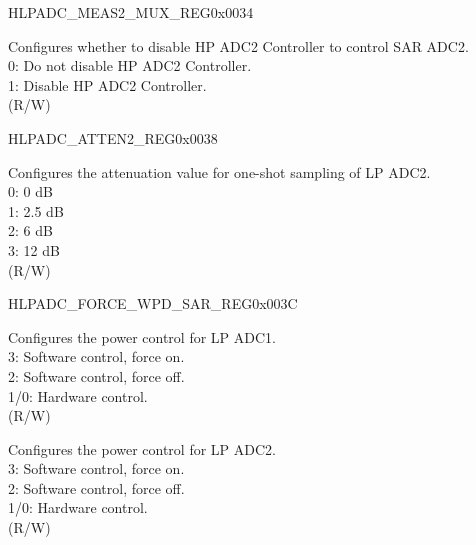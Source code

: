 \begin{register}{H}{LPADC\_MEAS2\_MUX\_REG}{0x0034}\label{regdesc:LPADCMEAS2MUXREG}
%
%
\regnewline%
\begin{regdesc}\begin{reglist}
\label{fielddesc:LPADCSAR2LPFORCE}\item [LPADC\_SAR2\_LP\_FORCE] Configures whether to disable HP ADC2 Controller to control SAR ADC2.\\
0: Do not disable HP ADC2 Controller. \\
1: Disable HP ADC2 Controller. \\
(R/W)
\end{reglist}\end{regdesc}
\end{register}


\begin{register}{H}{LPADC\_ATTEN2\_REG}{0x0038}\label{regdesc:LPADCATTEN2REG}
%
\regnewline%
\begin{regdesc}\begin{reglist}
\label{fielddesc:LPADCSAR2ATTEN}\item [LPADC\_SAR2\_ATTEN] Configures the attenuation value for one-shot sampling of LP ADC2.\\
0: 0 dB \\
1: 2.5 dB \\
2: 6 dB \\
3: 12 dB \\
(R/W)
\end{reglist}\end{regdesc}
\end{register}


\begin{register}{H}{LPADC\_FORCE\_WPD\_SAR\_REG}{0x003C}\label{regdesc:LPADCFORCEWPDSARREG}
%
%
%
\regnewline%
\begin{regdesc}\begin{reglist}
\label{fielddesc:LPADCFORCEXPDSAR1}\item [LPADC\_FORCE\_XPD\_SAR1]
Configures the power control for LP ADC1.\\
3: Software control, force on. \\
2: Software control, force off. \\
1/0: Hardware control.\\
(R/W)
\label{fielddesc:LPADCFORCEXPDSAR2}\item [LPADC\_FORCE\_XPD\_SAR2] Configures the power control for LP ADC2.\\
3: Software control, force on. \\
2: Software control, force off. \\
1/0: Hardware control.\\
(R/W)
\end{reglist}\end{regdesc}
\end{register}


